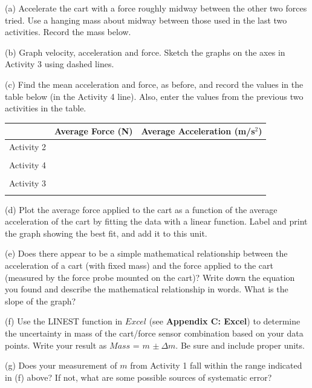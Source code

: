 (a) Accelerate the cart with a force roughly midway between the other two forces
tried. Use a hanging mass about midway between those used in the last two activities.
Record the mass below.
\vspace{10mm}

(b) Graph velocity, acceleration and force. Sketch the graphs on the axes in
Activity 3 using dashed lines.

(c) Find the mean acceleration and force, as before, and record the values in
the table below (in the Activity 4 line). Also, enter the values from the previous two activities in the table.

\vspace{0.3cm}
{\centering \begin{tabular}{|c|c|c|}
\hline 
&
Average Force (N)&
Average Acceleration (m/s\( ^{2} \))\\
\hline 
Activity 2&
&
\\
&
&
\\
\hline 
Activity 4&
&
\\
&
&
\\
\hline 
Activity 3&
&
\\
&
&
\\
\hline 
\end{tabular}\par}
\vspace{0.3cm}

(d) Plot the average force applied to the cart as a function of the average acceleration of the cart by fitting the data with a linear function. Label and print the graph showing the best fit, and add it to this unit.

(e) Does there appear to be a simple mathematical relationship between the acceleration of a cart (with fixed mass) and the force applied to the cart (measured by the force probe mounted on the cart)? Write down the equation you found and describe the mathematical relationship in words.  What is the slope of the graph?
\vspace{20mm}

(f) Use the LINEST function in $Excel$ (see \textbf{Appendix C: Excel}) to determine the uncertainty in mass of the cart/force sensor combination based on your data points.  Write your result as $Mass$ = $m$ \( \pm \ \Delta  m\). Be sure and include proper units.
\vspace{20mm}

(g) Does your measurement of $m$ from Activity 1 fall within the range indicated in (f) above? If not, what are some possible sources of systematic error?
\vspace{20mm}

